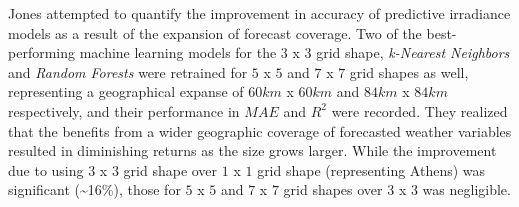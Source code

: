 \par Jones \cite{thesis_zach} attempted to quantify the improvement in accuracy of predictive irradiance models as a result of the expansion of forecast coverage. Two of the best-performing machine learning models for the $3$ x $3$ grid shape, \textit{k-Nearest Neighbors} and \textit{Random Forests} were retrained for $5$ x $5$ and $7$ x $7$ grid shapes as well, representing a geographical expanse of $60km$ x $60km$ and $84km$ x $84km$ respectively, and their performance in $MAE$ and $R^2$ were recorded. They realized that the benefits from a wider geographic coverage of forecasted weather variables resulted in diminishing returns as the size grows larger. While the improvement due to using $3$ x $3$ grid shape over $1$ x $1$ grid shape (representing Athens) was significant (\textasciitilde 16\%), those for $5$ x $5$ and $7$ x $7$ grid shapes over $3$ x $3$ was negligible.
\newpage